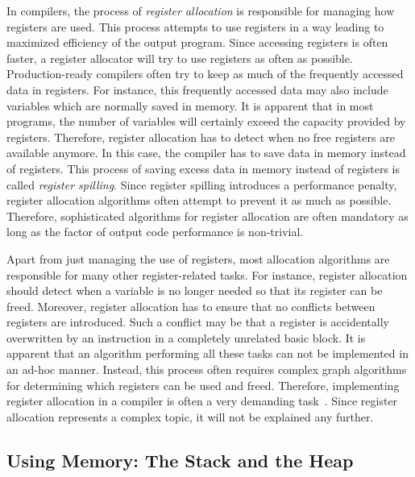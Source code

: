In compilers, the process of \emph{register allocation} is responsible for managing how registers are used.
This process attempts to use registers in a way leading to maximized efficiency of the output program.
Since accessing registers is often faster, a register allocator will try to use registers as often as possible.
Production-ready compilers often try to keep as much of the frequently accessed data in registers.
For instance, this frequently accessed data may also include variables which are normally saved in memory.
It is apparent that in most programs, the number of variables will certainly exceed the capacity provided by registers.
Therefore, register allocation has to detect when no free registers are available anymore.
In this case, the compiler has to save data in memory instead of registers.
This process of saving excess data in memory instead of registers is called \emph{register spilling}.
Since register spilling introduces a performance penalty, register allocation algorithms often attempt to prevent it as much as possible.
Therefore, sophisticated algorithms for register allocation are often mandatory as long as the factor of output code performance is non-trivial.

Apart from just managing the use of registers, most allocation algorithms are responsible for many other register-related tasks.
For instance, register allocation should detect when a variable is no longer needed so that its register can be freed.
Moreover, register allocation has to ensure that no conflicts between registers are introduced.
Such a conflict may be that a register is accidentally overwritten by an instruction in a completely unrelated basic block.
It is apparent that an algorithm performing all these tasks can not be implemented in an ad-hoc manner.
Instead, this process often requires complex graph algorithms for determining which registers can be used and freed.
Therefore, implementing register allocation in a compiler is often a very demanding task~\cite[pp.212-214]{Watson2017}.
Since register allocation represents a complex topic, it will not be explained any further.

\subsection{Using Memory: The Stack and the Heap}
\\
\\
\\
\\

